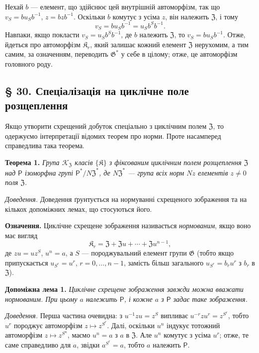 \documentclass[11pt]{article}
\begin{document}
Нехай \(b\) --- елемент, що здійснює цей внутрішній автоморфізм, так що \(v_S=bu_Sb^{-1}\), \(z=bzb^{-1}\). Оскільки \(b\) комутує з усіма \(z\), він належить \(\mathfrak Z\), і тому
\[
v_S=bu_Sb^{-1}=u_Sb^Sb^{-1}.
\]
Навпаки, якщо покласти \(v_S=u_Sb^Sb^{-1}\), де \(b\) належить \(\mathfrak Z\), то \(v_S=bu_Sb^{-1}\). Отже, йдеться про автоморфізм \(\mathfrak K_r\), який залишає кожний елемент \(\mathfrak Z\) нерухомим, а тим самим, за означенням, переводить \(\mathfrak G^*\) у себе в цілому; отже, це автоморфізм головного роду.

\subsection*{§ 30. Спеціалізація на циклічне поле розщеплення}\label{spezialisierung-auf-zyklische-zerfaellungskoerper}

Якщо утворити схрещений добуток спеціально з циклічним полем \(\mathfrak Z\), то одержуємо інтерпретації відомих теорем про норми. Проте насамперед справедлива така теорема.

\noindent\textbf{Теорема 1.} \emph{Група \(\mathscr K_{\mathfrak Z}\) класів \(\{\mathfrak K\}\) з фіксованим циклічним полем розщеплення \(\mathfrak Z\) над \(\mathsf{P}\) ізоморфна групі \(\mathsf{P}^*/N\mathfrak Z^*\), де \(N\mathfrak Z^*\) --- група всіх норм \(Nz\) елементів \(z\neq0\) поля \(\mathfrak Z\).}

\noindent\emph{Доведення.} Доведення ґрунтується на нормуванні схрещеного зображення та на кількох допоміжних лемах, що стосуються його.

\noindent\textbf{Означення.} Циклічне схрещене зображення називається \emph{нормованим}, якщо воно має вигляд
\[
\mathfrak K_r=\mathfrak Z+\mathfrak Zu+\cdots+\mathfrak Zu^{n-1},
\]
де \(zu=uz^S\), \(u^n=a\), а \(S\) --- породжувальний елемент групи \(\mathfrak G\) (тобто якщо припускається \(u_{S^r}=u^r\), \(r=0,\ldots,n-1\), замість більш загального \(u_{S^r}=b_ru^r\) з \(b_r\) в \(\mathfrak Z\)).

\noindent\textbf{Допоміжна лема 1.} \emph{Циклічне схрещене зображення завжди можна вважати нормованим. При цьому \(a\) належить \(\mathsf{P}\), і кожне \(a\) з \(\mathsf{P}\) задає таке зображення.}

\noindent\emph{Доведення.} Перша частина очевидна: з \(u^{-1}zu=z^S\) випливає \(u^{-r}zu^r=z^{S^r}\), тобто \(u^r\) породжує автоморфізм \(z\mapsto z^{S^r}\). Далі, оскільки \(u^n\) індукує тотожний автоморфізм \(z\mapsto z^{S^n}\), маємо \(u^n=a\) з \(a\) в \(\mathfrak Z\). Але \(u^n\) комутує з усіма \(u^r\); отже, те саме справедливо для \(a\), звідки \(a^{S^r}=a\), тобто \(a\) належить \(\mathsf{P}\).
\end{document}
